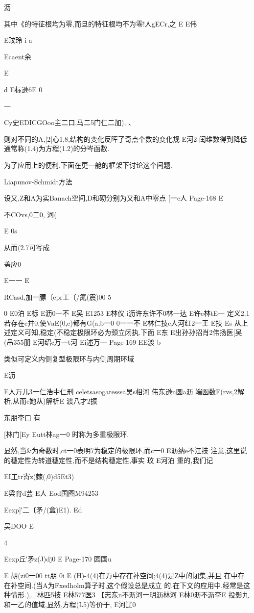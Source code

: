 {{{{{{{{{{{{{{{{{沥

其中《的特征根均为零,而旦的特征根均不为零!人gECr,之
E
E伟

E玟玲
i
a

Ecaent余

E

d
E标逊6E
0

一{Cy史EDICGOoo主二口,马二5门仁二加),
、

则对不同的A,|2|心1,8,结构的变化反晖了奇点个数的变化规
E河2
闰维数得到降低通常称(1.4)为方程(1.2)的分岑函数.

为了应用上的便利,下面在更一舱的框架下讨论这个间题.

Liapunov-Schmidt方法

设又,Z和A为实Banach空间,D和砌分别为又和A中零点
[一e人
Page-168
E

不COvs,0二0,
河(

E
0s

从而(2.7可写成

盖应0

E一一
E

RCasd,加一膘〔epr工〔/氮(震)00
5

0
E0泊
E标
E沥0一不
E吴
E1253
E林仪
i沥许东许不0林一达
E许e林tE一
定义2.1若存在e井0,使VaE(0,e)都有G(a,b一0
0一一不
E林仁技c人河红2一王
E技
Es
从上述定义可知,稳定(不稳定极限环必为颈立闭执.下面
E东
E出孙孙招肖2伟扬医[吴(吊355朋
E河绍c万一t河
Ei述万一
Page-169
EE渡
b

类似可定义内侧复型极限环与内侧周期环域

E沥

E人万儿3一仁浩中仁刑
celetsasogaresssa吴s相河
伟东逊n圆a沥
端函数F(rvs,2解析,从而c她从)解析E
渡八才2振

东朋李口
有

[林门[Ey
Eutt林ag一0
时称为多重极限环.

显然,当&为奇数时,ct一0表明7为稳定的极限环,而c一0
E沥纳e不江技
注意,这里说的穗定性为转道穗定性,而不是结构穗定性,事实
玟
E河泊
重的,我们记

EI工tr寄z(棘(,0)d5Et3)

E梁育d芸
E人
Eod国图M94253

Eexp]′二〔矛/(盒)E1).
Ed

吴DOO
E

4

Eexp丘′矛z(J)dj0
E
Page-170
园国u

E
胡(zi0一00
tt朋
0i
E
(H)-4(4)在万中存在补空间;4(4)是Z中的闭集,并且
在中存在补空间.(当A为Fxedholm算子时,这个假设总是成立
的.在下文的应用中,经常是这种情形.),.
[林匹5技
E林577医3
【志东n不沥河一明沥林河
E林0沥不沥李E
投影九和一乙的值域,显然,方程(L5)等价于,
E河辽0

}}}}}}}}}}}}}}}}}}
